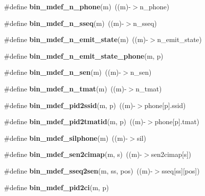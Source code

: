 \begin{DoxyCompactItemize}
\mbox{\label{bin__mdef_8h_af85788051ca16ad0d4be0bb4740ecf37}} 
\#define {\bfseries bin\+\_\+mdef\+\_\+n\+\_\+phone}(m)~((m)-\/$>$n\+\_\+phone)
\item 
\mbox{\label{bin__mdef_8h_aff6ddbc2ff917ad3aa8cfebf354307d1}} 
\#define {\bfseries bin\+\_\+mdef\+\_\+n\+\_\+sseq}(m)~((m)-\/$>$n\+\_\+sseq)
\item 
\mbox{\label{bin__mdef_8h_ad15b963c74030cb2826c73c55ad5fe6b}} 
\#define {\bfseries bin\+\_\+mdef\+\_\+n\+\_\+emit\+\_\+state}(m)~((m)-\/$>$n\+\_\+emit\+\_\+state)
\item 
\#define {\bfseries bin\+\_\+mdef\+\_\+n\+\_\+emit\+\_\+state\+\_\+phone}(m,  p)
\item 
\mbox{\label{bin__mdef_8h_a74b85bdbd4a8e47eba903a2c9f7ce968}} 
\#define {\bfseries bin\+\_\+mdef\+\_\+n\+\_\+sen}(m)~((m)-\/$>$n\+\_\+sen)
\item 
\mbox{\label{bin__mdef_8h_ab3acd37e62c109c4abcd933a713e837f}} 
\#define {\bfseries bin\+\_\+mdef\+\_\+n\+\_\+tmat}(m)~((m)-\/$>$n\+\_\+tmat)
\item 
\mbox{\label{bin__mdef_8h_ae2377a0b44df75e0f7e0fd20ca143fea}} 
\#define {\bfseries bin\+\_\+mdef\+\_\+pid2ssid}(m,  p)~((m)-\/$>$phone[p].ssid)
\item 
\mbox{\label{bin__mdef_8h_ae5c4319a3245f65ea397a7b1cad4ac79}} 
\#define {\bfseries bin\+\_\+mdef\+\_\+pid2tmatid}(m,  p)~((m)-\/$>$phone[p].tmat)
\item 
\mbox{\label{bin__mdef_8h_a0fe77933739b960287855bdd4451aa09}} 
\#define {\bfseries bin\+\_\+mdef\+\_\+silphone}(m)~((m)-\/$>$sil)
\item 
\mbox{\label{bin__mdef_8h_a3849ea9a9101990d045b8afcc0c273fb}} 
\#define {\bfseries bin\+\_\+mdef\+\_\+sen2cimap}(m,  s)~((m)-\/$>$sen2cimap[s])
\item 
\mbox{\label{bin__mdef_8h_aab50d23120a2310909697b7159360d80}} 
\#define {\bfseries bin\+\_\+mdef\+\_\+sseq2sen}(m,  ss,  pos)~((m)-\/$>$sseq[ss][pos])
\item 
\#define {\bfseries bin\+\_\+mdef\+\_\+pid2ci}(m,  p)
\end{DoxyCompactItemize}
